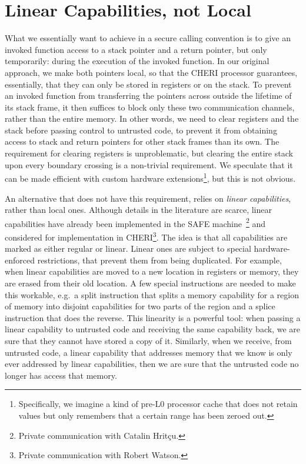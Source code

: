 \documentclass[sigplan,screen]{acmart}
\begin{document}
\section{Linear Capabilities, not Local}
What we essentially want to achieve in a secure calling convention is to give an invoked function access to a stack pointer and a return pointer, but only temporarily: during the execution of the invoked function. 
In our original approach, we make both pointers local, so that the CHERI processor guarantees, essentially, that they can only be stored in registers or on the stack.
To prevent an invoked function from transferring the pointers across outside the lifetime of its stack frame, it then suffices to block only these two communication channels, rather than the entire memory.
In other words, we need to clear registers and the stack before passing control to untrusted code, to prevent it from obtaining access to stack and return pointers for other stack frames than its own.
The requirement for clearing registers is unproblematic, but clearing the entire stack upon every boundary crossing is a non-trivial requirement.
We speculate that it can be made efficient with custom hardware extensions\footnote{Specifically, we imagine a kind of pre-L0 processor cache that does not retain values but only remembers that a certain range has been zeroed out.}, but this is not obvious.

An alternative that does not have this requirement, relies on \emph{linear capabilities}, rather than local ones.
Although details in the literature are scarce, linear capabilities have already been implemented in the SAFE machine~\citep{amorim_verified_2014}\footnote{Private communication with Catalin Hrit\c{c}u.} and considered for implementation in CHERI\footnote{Private communication with Robert Watson.}.
The idea is that all capabilities are marked as either regular or linear.
Linear ones are subject to special hardware-enforced restrictions, that prevent them from being duplicated.
For example, when linear capabilities are moved to a new location in registers or memory, they are erased from their old location.
A few special instructions are needed to make this workable, e.g.\ a split instruction that splits a memory capability for a region of memory into disjoint capabilities for two parts of the region and a splice instruction that does the reverse.
This linearity is a powerful tool: when passing a linear capability to untrusted code and receiving the same capability back, we are sure that they cannot have stored a copy of it.
Similarly, when we receive, from untrusted code, a linear capability that addresses memory that we know is only ever addressed by linear capabilities, then we are sure that the untrusted code no longer has access that memory.
\end{document}
